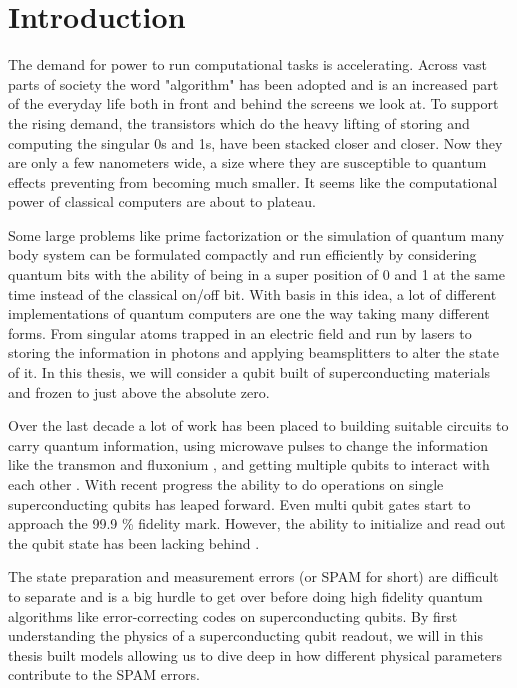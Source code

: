 \chapter{Introduction}\label{chap:Introduction}
The demand for power to run computational tasks is accelerating. Across vast parts of society the word "algorithm" has been adopted and is an increased part of the everyday life both in front and behind the screens we look at. To support the rising demand, the transistors which do the heavy lifting of storing and computing the singular 0s and 1s, have been stacked closer and closer. Now they are only a few nanometers wide, a size where they are susceptible to quantum effects preventing from becoming much smaller. It seems like the computational power of classical computers are about to plateau.\cite{}

Some large problems like prime factorization or the simulation of quantum many body system can be formulated compactly and run efficiently by considering quantum bits with the ability of being in a super position of 0 and 1 at the same time instead of the classical on/off bit. \cite{} With basis in this idea, a lot of different implementations of quantum computers are one the way taking many different forms. From singular atoms trapped in an electric field and run by lasers \cite{} to storing the information in photons and applying beamsplitters to alter the state of it\cite{}. In this thesis, we will consider a qubit built of superconducting materials and frozen to just above the absolute zero. \cite{}

Over the last decade a lot of work has been placed to building suitable circuits to carry quantum information\cite{}, using microwave pulses to change the information like the transmon \cite{} and fluxonium \cite{}, and getting multiple qubits to interact with each other \cite{}. With recent progress the ability to do operations on single superconducting qubits \cite{} has leaped forward. Even multi qubit gates start to approach the 99.9 \% fidelity mark\cite{}. However, the ability to initialize and read out the qubit state has been lacking behind \cite{}. 

The state preparation and measurement errors (or SPAM for short) are difficult to separate and is a big hurdle to get over before doing high fidelity quantum algorithms like error-correcting codes on superconducting qubits. By first understanding the physics of a superconducting qubit readout, we will in this thesis built models allowing us to dive deep in how different physical parameters contribute to the SPAM errors.




